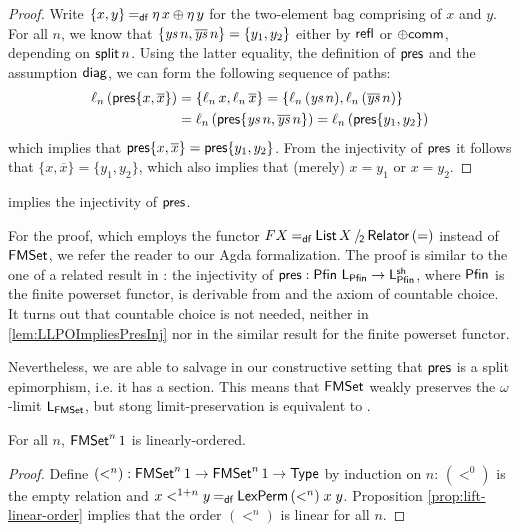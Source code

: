 \documentclass[runningheads]{llncs}
\begin{document}
\begin{proof}
  Write $\{x, y\} \mathbin{=_\mathsf{df}} \eta\, x \oplus \eta\, y$ for the two-element bag comprising of $x$ and $y$. For all $n$, we know that
    $\{\mathit{ys}\,n, \overline{\mathit{ys}}\,n\} = \{y_1, y_2\}$
  either by $\operatorname{\mathsf{refl}}$ or $\operatorname{\mathsf{\oplus comm}}$, depending on $\operatorname{\mathsf{split}} n$.
  Using the latter equality, the definition of $\operatorname{\mathsf{pres}}$ and the assumption $\operatorname{\mathsf{diag}}$, we can form the following sequence of paths:%
  \begin{align*}
    \ell_n\,(\operatorname{\mathsf{pres}} \{x, \overline{x}\})
      &= \{\ell_n \,x , \ell_n \,\overline{x}\}
      = \{\ell_n \,(\mathit{ys}\,n) , \ell_n\,(\overline{\mathit{ys}} \,n)\}\\
      &= \ell_n \, (\operatorname{\mathsf{pres}} \{\mathit{ys}\,n , \overline{\mathit{ys}}\,n\}) 
      = \ell_n \, (\operatorname{\mathsf{pres}} \{y_1 , y_2\})
  \end{align*}
  which implies that $\operatorname{\mathsf{pres}}\{x, \overline{x}\} = \operatorname{\mathsf{pres}}\{y_1, y_2\}$.
  From the injectivity of $\operatorname{\mathsf{pres}}$ it follows that $\{x, \overline{x}\} = \{y_1, y_2\}$, which also implies that (merely) $x = y_1$ or $x = y_2$.
\end{proof}

\begin{theorem}\label{lem:LLPOImpliesPresInj}
  \LLPO{} implies the injectivity of $\operatorname{\mathsf{pres}}$.
\end{theorem}
For the proof, which employs the functor $F X \DefEq \SetQuot[\List X][\Relator\,(=)]$ instead of $\operatorname{\mathsf{FMSet}}$, we refer the reader to our Agda formalization.  The proof is similar to the one of a related result in \cite{Veltri2021}: the injectivity of $\operatorname{\mathsf{pres}} : \operatorname{\mathsf{Pfin}} \,\mathsf{L}_{\operatorname{\mathsf{Pfin}}} \to \mathsf{L}^{\mathsf{sh}}_{\operatorname{\mathsf{Pfin}}}$, where $\operatorname{\mathsf{Pfin}}$ is the finite powerset functor, is derivable from \LLPO{} and the axiom of countable choice. It turns out that countable choice is not needed, neither in \cref{lem:LLPOImpliesPresInj} nor in the similar result for the finite powerset functor.

Nevertheless, we are able to salvage in our constructive setting that $\operatorname{\mathsf{pres}}$ is a split epimorphism, i.e. it has a section. This means that $\operatorname{\mathsf{FMSet}}$ weakly preserves the $\omega$-limit $\mathsf{L}_{\operatorname{\mathsf{FMSet}}}$, but stong limit-preservation is equivalent to \LLPO{}.
\begin{lemma}\label{lem:iter-linear}
For all $n$, $\operatorname{\mathsf{FMSet}}^n 1$ is linearly-ordered.
\end{lemma}
\begin{proof}
Define $(<^n) : \operatorname{\mathsf{FMSet}}^n 1 \to \operatorname{\mathsf{FMSet}}^n 1 \to \operatorname{\mathsf{Type}}$ by induction on $n$: $(<^0)$ is the empty relation and $x <^{1 + n} y \mathbin{=_\mathsf{df}} \mathsf{LexPerm}\,(<^n)\;x\;y$. Proposition \ref{prop:lift-linear-order} implies that the order $(<^n)$ is linear for all $n$.
\end{proof}
\end{document}
